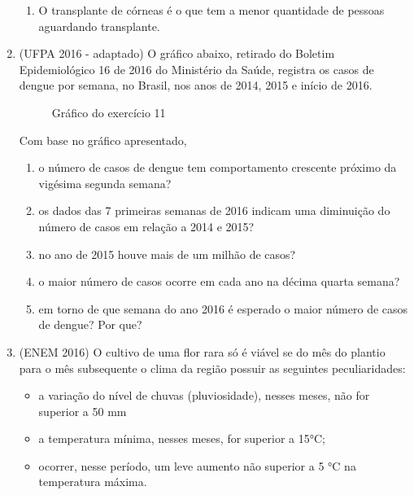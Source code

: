\begin{enumerate}
\begin{enumerate}
\item {} 
O transplante de córneas é o que tem a menor quantidade de pessoas aguardando transplante.

\end{enumerate}

\item (UFPA 2016 - adaptado)  O gráfico abaixo, retirado do Boletim Epidemiológico 16 de 2016 do Ministério da Saúde, registra os casos de dengue por semana, no Brasil, nos anos de 2014, 2015 e início de 2016.

\begin{figure}[H]
\centering
\capstart

\noindent{}
\caption{Gráfico do exercício 11}\label{\detokenize{PE103-E:id4}}\label{\detokenize{PE103-E:id21}}\end{figure}

Com base no gráfico apresentado,
\begin{enumerate}
\item {} 
o número de casos de dengue tem comportamento crescente próximo da vigésima segunda semana?

\item {} 
os dados das 7 primeiras semanas de 2016 indicam uma diminuição do número de casos em relação a 2014 e  2015?

\item {} 
no ano de 2015 houve mais de um milhão de casos?

\item {} 
o maior número de casos ocorre em cada ano na décima quarta semana?

\item {} 
em torno de que semana do ano 2016 é esperado o maior número de casos de dengue? Por que?

\end{enumerate}

\item (ENEM 2016)  O cultivo de uma flor rara só é viável se do mês do plantio para o mês subsequente o clima da região possuir as seguintes peculiaridades:
\begin{itemize}
\item {} 
a variação do nível de chuvas (pluviosidade), nesses meses, não for superior a  50 mm

\item {} 
a temperatura mínima, nesses meses, for superior a  15°C;

\item {} 
ocorrer, nesse período, um leve aumento não superior a  5 °C na temperatura máxima.


\end{itemize}
\end{enumerate}
